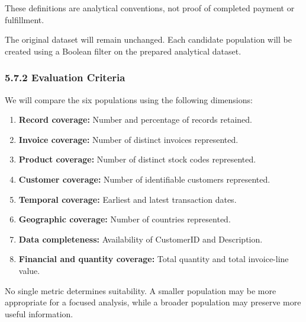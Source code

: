 \documentclass[11pt]{article}
\providecommand{\tightlist}{%
      \setlength{\itemsep}{0pt}\setlength{\parskip}{0pt}}
\begin{document}
These definitions are analytical conventions, not proof of completed
payment or fulfillment.

The original dataset will remain unchanged. Each candidate population
will be created using a Boolean filter on the prepared analytical
dataset.

    \subsubsection{5.7.2 Evaluation Criteria}\label{evaluation-criteria}

We will compare the six populations using the following dimensions:

\begin{enumerate}
\def\labelenumi{\arabic{enumi}.}
\tightlist
\item
  \textbf{Record coverage:} Number and percentage of records retained.
\item
  \textbf{Invoice coverage:} Number of distinct invoices represented.
\item
  \textbf{Product coverage:} Number of distinct stock codes represented.
\item
  \textbf{Customer coverage:} Number of identifiable customers
  represented.
\item
  \textbf{Temporal coverage:} Earliest and latest transaction dates.
\item
  \textbf{Geographic coverage:} Number of countries represented.
\item
  \textbf{Data completeness:} Availability of CustomerID and
  Description.
\item
  \textbf{Financial and quantity coverage:} Total quantity and total
  invoice-line value.
\end{enumerate}

No single metric determines suitability. A smaller population may be
more appropriate for a focused analysis, while a broader population may
preserve more useful information.
\end{document}
